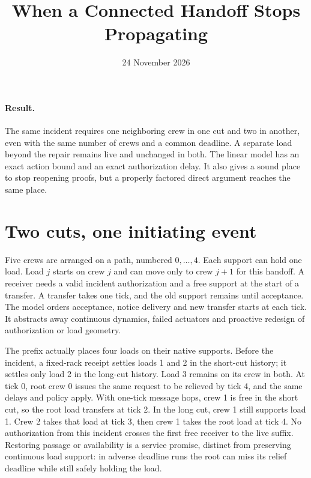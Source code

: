\documentclass[11pt]{article}
\title{When a Connected Handoff Stops Propagating}
\date{24 November 2026}
\begin{document}
\maketitle

\paragraph{Result.} The same incident requires one neighboring crew in one cut and two in another, even with the same number of crews and a common deadline. A separate load beyond the repair remains live and unchanged in both. The linear model has an exact action bound and an exact authorization delay. It also gives a sound place to stop reopening proofs, but a properly factored direct argument reaches the same place.

\section{Two cuts, one initiating event}
Five crews are arranged on a path, numbered \(0,\ldots,4\). Each support can hold one load. Load \(j\) starts on crew \(j\) and can move only to crew \(j+1\) for this handoff. A receiver needs a valid incident authorization and a free support at the start of a transfer. A transfer takes one tick, and the old support remains until acceptance. The model orders acceptance, notice delivery and new transfer starts at each tick. It abstracts away continuous dynamics, failed actuators and proactive redesign of authorization or load geometry.

The prefix actually places four loads on their native supports. Before the incident, a fixed-rack receipt settles loads 1 and 2 in the short-cut history; it settles only load 2 in the long-cut history. Load 3 remains on its crew in both. At tick 0, root crew 0 issues the same request to be relieved by tick 4, and the same delays and policy apply. With one-tick message hops, crew 1 is free in the short cut, so the root load transfers at tick 2. In the long cut, crew 1 still supports load 1. Crew 2 takes that load at tick 3, then crew 1 takes the root load at tick 4. No authorization from this incident crosses the first free receiver to the live suffix. Restoring passage or availability is a service promise, distinct from preserving continuous load support: in adverse deadline runs the root can miss its relief deadline while still safely holding the load.
\end{document}
